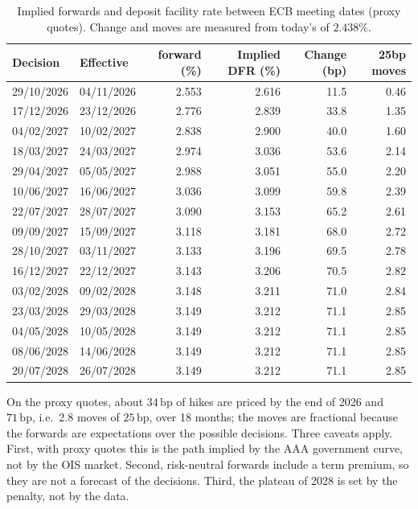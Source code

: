 \documentclass[11pt,a4paper]{article}
\theoremstyle{plain}
\theoremstyle{definition}
\newcommand{\bp}{\,\mathrm{bp}}
\newcommand{\estr}{\text{\texteuro STR}}
\begin{document}
\begin{table}[htbp]
\centering
\small
\begin{tabular}{@{}llrrrr@{}}
\toprule
Decision & Effective & \estr{} forward (\%) & Implied DFR (\%) & Change (bp) & 25bp moves \\
\midrule
29/10/2026 & 04/11/2026 & 2.553 & 2.616 & 11.5 & 0.46 \\
17/12/2026 & 23/12/2026 & 2.776 & 2.839 & 33.8 & 1.35 \\
04/02/2027 & 10/02/2027 & 2.838 & 2.900 & 40.0 & 1.60 \\
18/03/2027 & 24/03/2027 & 2.974 & 3.036 & 53.6 & 2.14 \\
29/04/2027 & 05/05/2027 & 2.988 & 3.051 & 55.0 & 2.20 \\
10/06/2027 & 16/06/2027 & 3.036 & 3.099 & 59.8 & 2.39 \\
22/07/2027 & 28/07/2027 & 3.090 & 3.153 & 65.2 & 2.61 \\
09/09/2027 & 15/09/2027 & 3.118 & 3.181 & 68.0 & 2.72 \\
28/10/2027 & 03/11/2027 & 3.133 & 3.196 & 69.5 & 2.78 \\
16/12/2027 & 22/12/2027 & 3.143 & 3.206 & 70.5 & 2.82 \\
03/02/2028 & 09/02/2028 & 3.148 & 3.211 & 71.0 & 2.84 \\
23/03/2028 & 29/03/2028 & 3.149 & 3.212 & 71.1 & 2.85 \\
04/05/2028 & 10/05/2028 & 3.149 & 3.212 & 71.1 & 2.85 \\
08/06/2028 & 14/06/2028 & 3.149 & 3.212 & 71.1 & 2.85 \\
20/07/2028 & 26/07/2028 & 3.149 & 3.212 & 71.1 & 2.85 \\
\bottomrule
\end{tabular}
\caption{Implied \estr{} forwards and deposit facility rate between ECB meeting dates (proxy quotes). Change and moves are measured from today's \estr{} of $2.438\%$.}
\label{tab:ecb-path}
\end{table}

On the proxy quotes, about $34\bp$ of hikes are priced by the end of 2026 and $71\bp$, i.e.\ 2.8 moves of $25\bp$, over 18 months; the moves are fractional because the forwards are expectations over the possible decisions. Three caveats apply. First, with proxy quotes this is the path implied by the AAA government curve, not by the OIS market. Second, risk-neutral forwards include a term premium, so they are not a forecast of the decisions. Third, the plateau of 2028 is set by the penalty, not by the data.
\end{document}
